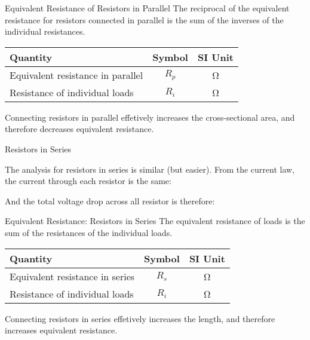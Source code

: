 \documentclass[12pt,aspectratio=169]{beamer}
\begin{document}
\begin{frame}{Equivalent Resistance of Resistors in Parallel} 
  The reciprocal of the equivalent resistance for resistors connected in
  parallel is the sum of the inverses of the individual resistances.

  \begin{center}
    \begin{tabular}{l|c|c}
      \rowcolor{pink}
      \textbf{Quantity} & \textbf{Symbol} & \textbf{SI Unit} \\ \hline
      Equivalent resistance in parallel & $R_p$ & \si\ohm \\
      Resistance of individual loads    & $R_i$ & \si\ohm
    \end{tabular}
  \end{center}
  Connecting resistors in parallel effetively increases the cross-sectional
  area, and therefore decreases equivalent resistance.
\end{frame}



\begin{frame}{Resistors in Series}
  \begin{center}
  \end{center}

  \vspace{.1in}The analysis for resistors in series is similar (but easier).
  From the current law, the current through each resistor is the same:


  \vspace{-.15in}And the total voltage drop across all resistor is therefore:

\end{frame}



\begin{frame}{Equivalent Resistance: Resistors in Series}
  The equivalent resistance of loads is the sum of the resistances of the
  individual loads.
  
  \begin{center}
    \begin{tabular}{l|c|c}
      \rowcolor{pink}
      \textbf{Quantity} & \textbf{Symbol} & \textbf{SI Unit} \\ \hline
      Equivalent resistance in series & $R_s$ & \si\ohm \\
      Resistance of individual loads  & $R_i$ & \si\ohm
    \end{tabular}
  \end{center}
  Connecting resistors in series effetively increases the length, and
  therefore increases equivalent resistance.
\end{frame}
\end{document}
